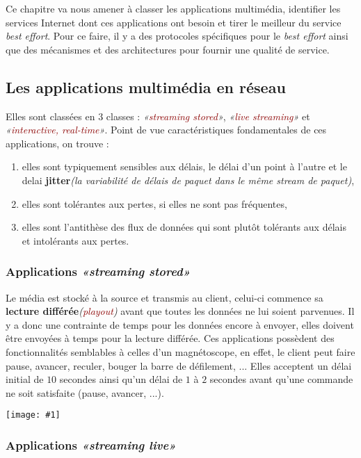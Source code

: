 \documentclass{article}
\newcommand{\red}[1]{\textcolor{darkred}{#1}}
\newcommand{\imgR}[2]{\begin{center}\texttt{[image: \#1]}\end{center}}
\begin{document}
Ce chapitre va nous amener à classer les applications multimédia, identifier les services Internet dont ces 
applications ont besoin et tirer le meilleur du service \textit{best effort}. Pour ce faire, il y a des 
protocoles spécifiques pour le \textit{best effort} ainsi que des mécanismes et des architectures pour fournir 
une qualité de service.

\subsection{Les applications multimédia en réseau}

Elles sont classées en 3 classes : \textit{«\red{streaming stored}»}, \textit{«\red{live streaming}»} et 
\textit{«\red{interactive, real-time}»}. Point de vue caractéristiques fondamentales de ces applications, on 
trouve :
\begin{enumerate}
\item elles sont typiquement sensibles aux délais, le délai d'un point à l'autre et le delai 
\textbf{jitter}\textit{(la variabilité de délais de paquet dans le même stream de paquet)},
\item elles sont tolérantes aux pertes, si elles ne sont pas fréquentes,
\item elles sont l'antithèse des flux de données qui sont plutôt tolérants aux délais et intolérants aux pertes.
\end{enumerate}

\subsubsection{Applications \textit{«streaming stored»}}

Le média est stocké à la source et transmis au client, celui-ci commence sa \textbf{lecture 
différée}\textit{(\red{playout})} avant que toutes les données ne lui soient parvenues. Il y a donc une 
contrainte de temps pour les données encore à envoyer, elles doivent être envoyées à temps pour la lecture 
différée. Ces applications possèdent des fonctionnalités semblables à celles d'un magnétoscope, en effet, le 
client peut faire pause, avancer, reculer, bouger la barre de défilement, ... Elles acceptent un délai initial de 
$10$ secondes ainsi qu'un délai de $1$ à $2$ secondes avant qu'une commande ne soit satisfaite (pause, avancer, 
...).

\imgR{CN_172.png}{400}

\subsubsection{Applications \textit{«streaming live»}}
\end{document}
